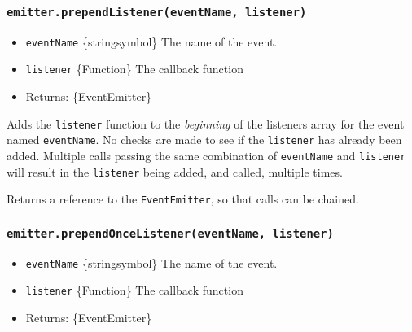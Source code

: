 \subsubsection{\texorpdfstring{\texttt{emitter.prependListener(eventName,\ listener)}}{emitter.prependListener(eventName, listener)}}\label{emitter.prependlistenereventname-listener}

\begin{itemize}
\tightlist
\item
  \texttt{eventName} \{string\textbar symbol\} The name of the event.
\item
  \texttt{listener} \{Function\} The callback function
\item
  Returns: \{EventEmitter\}
\end{itemize}

Adds the \texttt{listener} function to the \emph{beginning} of the
listeners array for the event named \texttt{eventName}. No checks are
made to see if the \texttt{listener} has already been added. Multiple
calls passing the same combination of \texttt{eventName} and
\texttt{listener} will result in the \texttt{listener} being added, and
called, multiple times.

\begin{Shaded}
\begin{Highlighting}[]
\NormalTok{(}\OperatorTok{,}\KeywordTok{=\textgreater{}}\NormalTok{ \{}
  \NormalTok{(}\NormalTok{)}\OperatorTok{;}
\NormalTok{\})}\OperatorTok{;}
\end{Highlighting}
\end{Shaded}

Returns a reference to the \texttt{EventEmitter}, so that calls can be
chained.

\subsubsection{\texorpdfstring{\texttt{emitter.prependOnceListener(eventName,\ listener)}}{emitter.prependOnceListener(eventName, listener)}}\label{emitter.prependoncelistenereventname-listener}

\begin{itemize}
\tightlist
\item
  \texttt{eventName} \{string\textbar symbol\} The name of the event.
\item
  \texttt{listener} \{Function\} The callback function
\item
  Returns: \{EventEmitter\}
\end{itemize}

